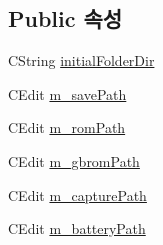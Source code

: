 \subsection*{Public 속성}
\begin{DoxyCompactItemize}
\item 
C\+String \mbox{\hyperlink{class_directories_a5f307fd959af44c194c520b5452cafba}{initial\+Folder\+Dir}}
\item 
C\+Edit \mbox{\hyperlink{class_directories_a9293c8e99ad84e8a78d127ff09534d6c}{m\+\_\+save\+Path}}
\item 
C\+Edit \mbox{\hyperlink{class_directories_a2d5fa2646d8216ec7f2093073174ab38}{m\+\_\+rom\+Path}}
\item 
C\+Edit \mbox{\hyperlink{class_directories_adffa22cb6f6be3c0b7327670dd885f83}{m\+\_\+gbrom\+Path}}
\item 
C\+Edit \mbox{\hyperlink{class_directories_a4010cf261f54e1477c6587395fd055d4}{m\+\_\+capture\+Path}}
\item 
C\+Edit \mbox{\hyperlink{class_directories_af8f18fc9d1fbcd0df0cba4ec6fb862de}{m\+\_\+battery\+Path}}
\end{DoxyCompactItemize}
